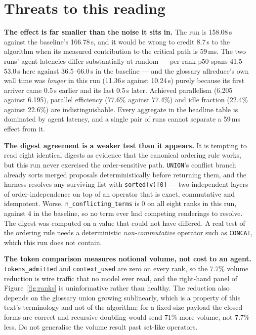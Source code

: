 \documentclass[11pt]{article}
\begin{document}
\section{Threats to this reading}

\textbf{The effect is far smaller than the noise it sits in.} The run is 158.08\,s against the
baseline's 166.78\,s, and it would be wrong to credit 8.7\,s to the algorithm when its measured
contribution to the critical path is 59\,ms. The two runs' agent latencies differ substantially at
random --- per-rank p50 spans 41.5--53.0\,s here against 36.5--66.0\,s in the baseline --- and the
glossary allreduce's own wall time was \emph{longer} in this run (11.36\,s against 10.24\,s)
purely because its first arriver came 0.5\,s earlier and its last 0.5\,s later. Achieved
parallelism (6.205 against 6.195), parallel efficiency (77.6\% against 77.4\%) and idle fraction
(22.4\% against 22.6\%) are indistinguishable. Every aggregate in the headline table is dominated
by agent latency, and a single pair of runs cannot separate a 59\,ms effect from it.

\textbf{The digest agreement is a weaker test than it appears.} It is tempting to read eight
identical digests as evidence that the canonical ordering rule works, but this run never exercised
the order-sensitive path. \texttt{UNION}'s conflict branch already sorts merged proposals
deterministically before returning them, and the harness resolves any surviving list with
\texttt{sorted(v)[0]} --- two independent layers of order-independence on top of an operator that
is exact, commutative and idempotent. Worse, \texttt{n\_conflicting\_terms} is 0 on all eight ranks
in this run, against 4 in the baseline, so no term ever had competing renderings to resolve. The
digest was computed on a value that could not have differed. A real test of the ordering rule needs
a deterministic \emph{non-commutative} operator such as \texttt{CONCAT}, which this run does not
contain.

\textbf{The token comparison measures notional volume, not cost to an agent.}
\texttt{tokens\_admitted} and \texttt{context\_used} are zero on every rank, so the 7.7\%
volume reduction is wire traffic that no model ever read, and the right-hand panel of
Figure~\ref{fig:ranks} is uninformative rather than healthy. The reduction also depends on the
glossary union growing sublinearly, which is a property of this text's terminology and not of the
algorithm; for a fixed-size payload the closed forms are correct and recursive doubling would send
71\% more volume, not 7.7\% less. Do not generalise the volume result past set-like operators.
\end{document}
